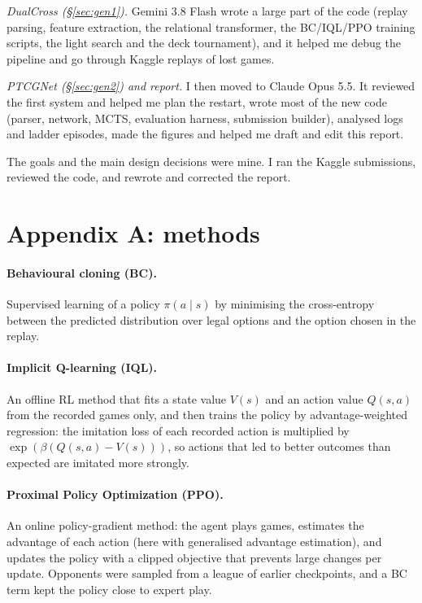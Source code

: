 \documentclass{article}
\begin{document}
\emph{DualCross (\S\ref{sec:gen1}).} Gemini 3.8 Flash wrote a large part of the code (replay parsing, feature extraction, the relational transformer, the BC/IQL/PPO training scripts, the light search and the deck tournament), and it helped me debug the pipeline and go through Kaggle replays of lost games.

\emph{PTCGNet (\S\ref{sec:gen2}) and report.} I then moved to Claude Opus 5.5. It reviewed the first system and helped me plan the restart, wrote most of the new code (parser, network, MCTS, evaluation harness, submission builder), analysed logs and ladder episodes, made the figures and helped me draft and edit this report.

The goals and the main design decisions were mine. I ran the Kaggle submissions, reviewed the code, and rewrote and corrected the report.




\clearpage
\appendix
\section*{Appendix A: methods}\label{app:methods}
\paragraph*{Behavioural cloning (BC).} Supervised learning of a policy $\pi(a\mid s)$ by minimising the cross-entropy between the predicted distribution over legal options and the option chosen in the replay.
\paragraph*{Implicit Q-learning (IQL).} An offline RL method that fits a state value $V(s)$ and an action value $Q(s,a)$ from the recorded games only, and then trains the policy by advantage-weighted regression: the imitation loss of each recorded action is multiplied by $\exp(\beta(Q(s,a)-V(s)))$, so actions that led to better outcomes than expected are imitated more strongly.
\paragraph*{Proximal Policy Optimization (PPO).} An online policy-gradient method: the agent plays games, estimates the advantage of each action (here with generalised advantage estimation), and updates the policy with a clipped objective that prevents large changes per update. Opponents were sampled from a league of earlier checkpoints, and a BC term kept the policy close to expert play.
\end{document}
